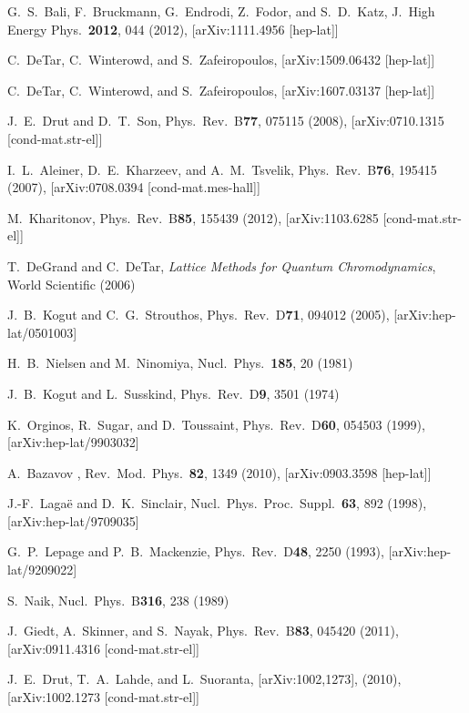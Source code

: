 \documentclass[aps,prd,twocolumn,showpacs,superscriptaddress,groupedaddress]{revtex4}  %
\begin{document}
\begin{thebibliography}{99}
G.~S.~Bali, F.~Bruckmann, G.~Endrodi, Z.~Fodor, and S.~D.~Katz, J.\ High Energy Phys.\ {\bf 2012}, 044 (2012), [arXiv:1111.4956 [hep-lat]]

C.~DeTar, C.~Winterowd, and S.~Zafeiropoulos, [arXiv:1509.06432 [hep-lat]]

C.~DeTar, C.~Winterowd, and S.~Zafeiropoulos, [arXiv:1607.03137 [hep-lat]]

J.~E.~Drut and D.~T.~Son, Phys.\ Rev.\ B{\bf 77}, 075115 (2008), [arXiv:0710.1315 [cond-mat.str-el]]

I.~L.~Aleiner, D.~E.~Kharzeev, and A.~M.~Tsvelik, Phys.\ Rev.\ B{\bf 76}, 195415 (2007), [arXiv:0708.0394 [cond-mat.mes-hall]]

M.~Kharitonov, Phys.\ Rev.\ B{\bf 85}, 155439 (2012), [arXiv:1103.6285 [cond-mat.str-el]]

T.~DeGrand and C.~DeTar, {\it Lattice Methods for Quantum Chromodynamics}, World Scientific (2006)

J.~B.~Kogut and C.~G.~Strouthos, Phys.\ Rev.\ D{\bf 71}, 094012 (2005), [arXiv:hep-lat/0501003]

H.~B.~Nielsen and M.~Ninomiya, Nucl.\ Phys.\ {\bf 185}, 20 (1981)

J.~B.~Kogut and L.~Susskind, Phys.\ Rev.\ D{\bf 9}, 3501 (1974)

K.~Orginos, R.~Sugar, and D.~Toussaint, Phys.\ Rev.\ D{\bf 60}, 054503 (1999), [arXiv:hep-lat/9903032]

A.~Bazavov \etal, Rev.\ Mod.\ Phys.\ {\bf 82}, 1349 (2010), [arXiv:0903.3598 [hep-lat]]

J.-F.~Laga\"e and D.~K.~Sinclair, Nucl.\ Phys.\ Proc.\ Suppl.\ {\bf 63}, 892 (1998), [arXiv:hep-lat/9709035]

G.~P.~Lepage and P.~B.~Mackenzie, Phys.\ Rev.\ D{\bf 48}, 2250 (1993), [arXiv:hep-lat/9209022]

S.~Naik, Nucl.\ Phys.\ B{\bf 316}, 238 (1989)

J.~Giedt, A.~Skinner, and S.~Nayak, Phys.\ Rev.\ B{\bf 83}, 045420 (2011), [arXiv:0911.4316 [cond-mat.str-el]]

J.~E.~Drut, T.~A.~Lahde, and L.~Suoranta, [arXiv:1002,1273], (2010), [arXiv:1002.1273 [cond-mat.str-el]]


\end{thebibliography}
\end{document}
